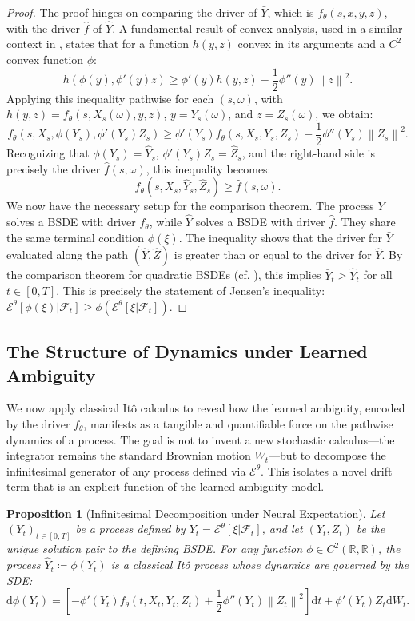 \documentclass[qian]{imsart}
\newcommand{\R}{\mathbb{R}}
\newcommand{\Fcal}{\mathcal{F}}
\newcommand{\cEneutheta}{\mathcal{E}^{\theta}}
\newcommand{\dd}{\mathrm{d}}
\newcommand{\norm}[1]{\left\lVert#1\right\rVert}
\theoremstyle{plain}
\newtheorem{proposition}[theorem]{Proposition}
\theoremstyle{definition}
\begin{document}
\begin{proof}
The proof hinges on comparing the driver of $\bar{Y}$, which is $f_\theta(s,x,y,z)$, with the driver $\hat{f}$ of $\hat{Y}$. A fundamental result of convex analysis, used in a similar context in \cite{BriandHu2008}, states that for a function $h(y,z)$ convex in its arguments and a $C^2$ convex function $\phi$:
\[ h( \phi(y), \phi'(y)z ) \ge \phi'(y)h(y,z) - \frac{1}{2}\phi''(y)\norm{z}^2. \]
Applying this inequality pathwise for each $(s, \omega)$, with $h(y,z)=f_\theta(s,X_s(\omega),y,z)$, $y=Y_s(\omega)$, and $z=Z_s(\omega)$, we obtain:
\[ f_\theta(s, X_s, \phi(Y_s), \phi'(Y_s)Z_s) \ge \phi'(Y_s)f_\theta(s, X_s, Y_s, Z_s) - \frac{1}{2}\phi''(Y_s)\norm{Z_s}^2. \]
Recognizing that $\phi(Y_s) = \hat{Y}_s$, $\phi'(Y_s)Z_s = \hat{Z}_s$, and the right-hand side is precisely the driver $\hat{f}(s, \omega)$, this inequality becomes:
\[ f_\theta(s, X_s, \hat{Y}_s, \hat{Z}_s) \ge \hat{f}(s, \omega). \]
We now have the necessary setup for the comparison theorem. The process $\bar{Y}$ solves a BSDE with driver $f_\theta$, while $\hat{Y}$ solves a BSDE with driver $\hat{f}$. They share the same terminal condition $\phi(\xi)$. The inequality shows that the driver for $\bar{Y}$ evaluated along the path $(\hat{Y}, \hat{Z})$ is greater than or equal to the driver for $\hat{Y}$. By the comparison theorem for quadratic BSDEs (cf. \cite{Kobylanski2000}), this implies $\bar{Y}_t \ge \hat{Y}_t$ for all $t \in [0,T]$. This is precisely the statement of Jensen's inequality: $\cEneutheta[\phi(\xi) | \Fcal_t] \ge \phi(\cEneutheta[\xi | \Fcal_t])$.
\end{proof}

\subsection{The Structure of Dynamics under Learned Ambiguity}

We now apply classical Itô calculus to reveal how the learned ambiguity, encoded by the driver $f_\theta$, manifests as a tangible and quantifiable force on the pathwise dynamics of a process. The goal is not to invent a new stochastic calculus---the integrator remains the standard Brownian motion $W_t$---but to decompose the infinitesimal generator of any process defined via $\cEneutheta$. This isolates a novel drift term that is an explicit function of the learned ambiguity model.

\begin{proposition}[Infinitesimal Decomposition under Neural Expectation]
\label{prop:neural_ito_decomposition}
Let $(Y_t)_{t \in [0,T]}$ be a process defined by $Y_t = \cEneutheta[\xi | \Fcal_t]$, and let $(Y_t, Z_t)$ be the unique solution pair to the defining BSDE. For any function $\phi \in C^2(\R, \R)$, the process $\hat{Y}_t \coloneqq \phi(Y_t)$ is a classical Itô process whose dynamics are governed by the SDE:
\begin{equation}
\label{eq:neural_ito_decomposition}
\dd \phi(Y_t) = \left[ -\phi'(Y_t)f_\theta(t, X_t, Y_t, Z_t) + \frac{1}{2}\phi''(Y_t)\norm{Z_t}^2 \right] \dd t + \phi'(Y_t)Z_t \dd W_t.
\end{equation}
\end{proposition}
\end{document}
